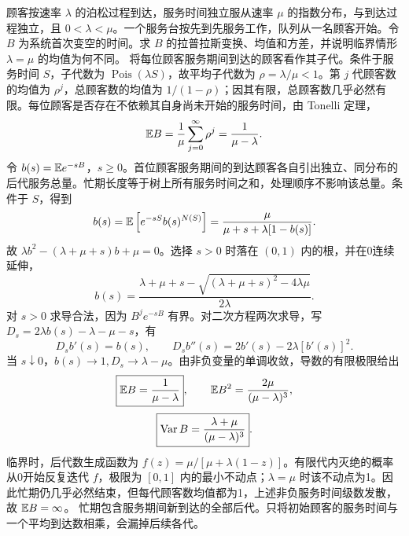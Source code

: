 顾客按速率 $\lambda$ 的泊松过程到达，服务时间独立服从速率 $\mu$ 的指数分布，与到达过程独立，且 $0<\lambda<\mu$。一个服务台按先到先服务工作，队列从一名顾客开始。令 $B$ 为系统首次变空的时间。求 $B$ 的拉普拉斯变换、均值和方差，并说明临界情形 $\lambda=\mu$ 的均值为何不同。
\solution 将每位顾客服务期间到达的顾客看作其子代。条件于服务时间 $S$，子代数为 $\operatorname{Pois}(\lambda S)$，故平均子代数为 $\rho=\lambda/\mu<1$。第 $j$ 代顾客数的均值为 $\rho^j$，总顾客数的均值为 $1/(1-\rho)$；因其有限，总顾客数几乎必然有限。每位顾客是否存在不依赖其自身尚未开始的服务时间，由 Tonelli 定理，
\[
 \mathbb{E} B=\frac1\mu\sum_{j=0}^\infty\rho^j=\frac1{\mu-\lambda}.
\]
令 $b(s)=\mathbb{E} e^{-sB}$，$s\ge0$。首位顾客服务期间的到达顾客各自引出独立、同分布的后代服务总量。忙期长度等于树上所有服务时间之和，处理顺序不影响该总量。条件于 $S$，得到
\[
 b(s)=\mathbb{E}\left[e^{-sS}b(s)^{N(S)}\right]
 =\frac{\mu}{\mu+s+\lambda[1-b(s)]}.
\]
故 $\lambda b^2-(\lambda+\mu+s)b+\mu=0$。选择 $s>0$ 时落在 $(0,1)$ 内的根，并在0连续延伸，
\[
 \boxed{b(s)=\frac{\lambda+\mu+s-\sqrt{(\lambda+\mu+s)^2-4\lambda\mu}}{2\lambda}}.
\]
对 $s>0$ 求导合法，因为 $B^je^{-sB}$ 有界。对二次方程两次求导，写 $D_s=2\lambda b(s)-\lambda-\mu-s$，有
\[
 D_s b'(s)=b(s),\qquad
 D_s b''(s)=2b'(s)-2\lambda[b'(s)]^2.
\]
当 $s\downarrow0$，$b(s)\to1,D_s\to\lambda-\mu$。由非负变量的单调收敛，导数的有限极限给出
\[
 \boxed{\mathbb{E} B=\frac1{\mu-\lambda}},\qquad
 \mathbb{E} B^2=\frac{2\mu}{(\mu-\lambda)^3},
\]
\[
 \boxed{\operatorname{Var} B=\frac{\lambda+\mu}{(\mu-\lambda)^3}}.
\]
临界时，后代数生成函数为 $f(z)=\mu/[\mu+\lambda(1-z)]$。有限代内灭绝的概率从0开始反复迭代 $f$，极限为 $[0,1]$ 内的最小不动点；$\lambda=\mu$ 时该不动点为1。因此忙期仍几乎必然结束，但每代顾客数均值都为1，上述非负服务时间级数发散，故 $\mathbb{E} B=\infty$。
\insight 忙期包含服务期间新到达的全部后代。只将初始顾客的服务时间与一个平均到达数相乘，会漏掉后续各代。

